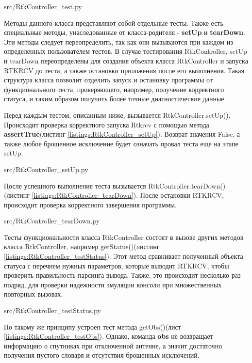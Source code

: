
{src/RtkController_test.py}

Методы данного класса представляют собой отдельные тесты. Также есть специальные методы, унаследованные от класса-родителя - \textbf{setUp} и \textbf{tearDown}. Эти методы следует переопределить, так как они вызываются при каждом из определенных пользователем тестов. В случае тестирования RtkController, setUp и tearDown переопределены для создания объекта класса RtkController и запуска RTKRCV до теста, а также остановки приложения после его выполнения. Такая структура класса позволит отделить запуск и остановку программы от функционального теста, проверяющего, например, получение корректного статуса, и таким образом получить более точные диагностические данные.

Перед каждым тестом, описанным ниже, вызывается RtkController.setUp(). Происходит проверка корректного запуска Rtkrcv с помощью метода \textbf{assertTrue}(листинг \ref{listings:RtkController_setUp}). Возврат значения False, а также любое брошенное исключение будет означать провал теста еще на этапе setUp.


{src/RtkController_setUp.py}

После успешного выполнения теста вызывается RtkController.tearDown()(листинг \ref{listings:RtkController_tearDown}). После остановки RTKRCV, происходит проверка корректного завершения программы.


{src/RtkController_tearDown.py}

Тесты функциональности класса RtkController состоят в вызове других методов класса RtkController, например getStatus()(листинг \ref{listings:RtkController_testStatus}). Этот метод сравнивает полученный объекта статуса с перечнем нужных параметров, которые выводит RTKRCV, чтобы проверить правильность парсинга вывода. Также, это происходит несколько раз подряд, для проверки надежности эмуляции консоли при множественных повторных вызовах.


{src/RtkController_testStatus.py}

По такому же принципу устроен тест метода getObs()(лист \ref{listings:RtkController_testObs}). Однако, команда \textbf{obs} не возвращает информацию о спутниках при отключенной антенне, а значит достаточно получения пустого словаря и отсутствия брошенных исключений.

